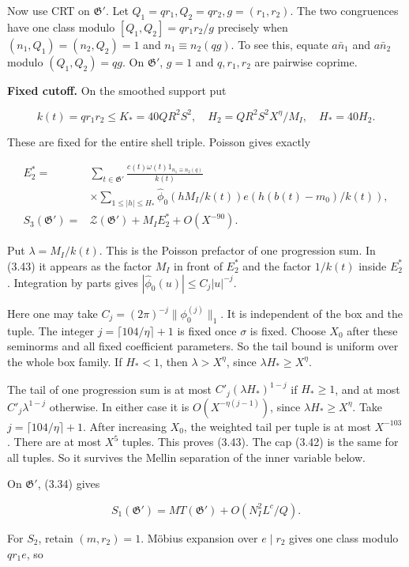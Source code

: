 Now use CRT on $\mathfrak G'$. Let
$Q_1=qr_1,Q_2=qr_2,g=(r_1,r_2)$.
The two congruences have one class modulo $[Q_1,Q_2]=qr_1r_2/g$ precisely when
$(n_1,Q_1)=(n_2,Q_2)=1$ and $n_1\equiv n_2(qg)$.
To see this, equate $a\bar n_1$ and $a\bar n_2$ modulo $(Q_1,Q_2)=qg$.
On $\mathfrak G'$, $g=1$ and $q,r_1,r_2$ are pairwise coprime.

\textbf{Fixed cutoff.} On the smoothed support put

\[
k(t)=qr_1r_2\le K_*=40QR^2S^2,\quad
H_2=QR^2S^2X^\eta/M_I,\quad H_*=40H_2.
\tag{3.42}
\]

These are fixed for the entire shell triple. Poisson gives exactly

\[
\begin{aligned}
E_2^*={}&\sum_{t\in\mathfrak G'}
 \frac{c(t)\omega(t)1_{n_1\equiv n_2(q)}}{k(t)}\\
&\times\sum_{1\le|h|\le H_*}\widehat\phi_0(hM_I/k(t))
                      e(h(b(t)-m_0)/k(t)),\\
S_3(\mathfrak G')={}&\mathcal Z(\mathfrak G')+M_IE_2^*+O(X^{-90}).
\end{aligned}
\tag{3.43}
\]

Put $\lambda=M_I/k(t)$. This is the Poisson prefactor of one
progression sum. In (3.43) it appears as the factor $M_I$ in front of
$E_2^*$ and the factor $1/k(t)$ inside $E_2^*$.
Integration by parts gives
$|\widehat\phi_0(u)|\le C_j|u|^{-j}$.

Here one may take $C_j=(2\pi)^{-j}\|\phi_0^{(j)}\|_1$.
It is independent of the box and the tuple.
The integer $j=\lceil104/\eta\rceil+1$ is fixed once $\sigma$ is fixed.
Choose $X_0$ after these seminorms and all fixed coefficient parameters.
So the tail bound is uniform over the whole box family.
If $H_*<1$, then $\lambda>X^\eta$, since $\lambda H_*\ge X^\eta$.

The tail of one progression
sum is at most $C'_j(\lambda H_*)^{1-j}$ if $H_*\ge1$, and at
most $C'_j\lambda^{1-j}$ otherwise. In either case it is
$O(X^{-\eta(j-1)})$, since $\lambda H_*\ge X^\eta$.
Take $j=\lceil104/\eta\rceil+1$. After increasing $X_0$, the
weighted tail per tuple is at most $X^{-103}$. There are at most
$X^5$ tuples. This proves (3.43).
The cap (3.42) is the same for all tuples.
So it survives the Mellin separation of the inner variable below.

On $\mathfrak G'$, (3.34) gives

\[
S_1(\mathfrak G')=MT(\mathfrak G')+O(N_I^2L^c/Q).
\tag{3.44}
\]

For $S_2$, retain $(m,r_2)=1$. Möbius expansion over $e\mid r_2$
gives one class modulo $qr_1e$, so

